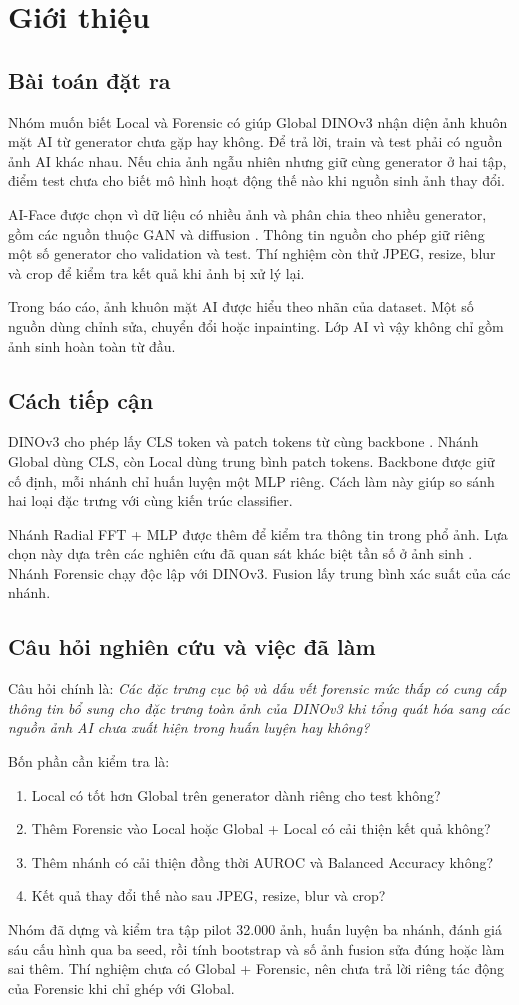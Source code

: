 \section{Giới thiệu}
\subsection{Bài toán đặt ra}
Nhóm muốn biết Local và Forensic có giúp Global DINOv3 nhận diện ảnh khuôn mặt AI từ generator chưa gặp hay không. Để trả lời, train và test phải có nguồn ảnh AI khác nhau. Nếu chia ảnh ngẫu nhiên nhưng giữ cùng generator ở hai tập, điểm test chưa cho biết mô hình hoạt động thế nào khi nguồn sinh ảnh thay đổi.

AI-Face được chọn vì dữ liệu có nhiều ảnh và phân chia theo nhiều generator, gồm các nguồn thuộc GAN và diffusion \cite{Lin_2025_CVPR}. Thông tin nguồn cho phép giữ riêng một số generator cho validation và test. Thí nghiệm còn thử JPEG, resize, blur và crop để kiểm tra kết quả khi ảnh bị xử lý lại.

Trong báo cáo, ảnh khuôn mặt AI được hiểu theo nhãn của dataset. Một số nguồn dùng chỉnh sửa, chuyển đổi hoặc inpainting. Lớp AI vì vậy không chỉ gồm ảnh sinh hoàn toàn từ đầu.

\subsection{Cách tiếp cận}
DINOv3 cho phép lấy CLS token và patch tokens từ cùng backbone \cite{DINOv3_2025}. Nhánh Global dùng CLS, còn Local dùng trung bình patch tokens. Backbone được giữ cố định, mỗi nhánh chỉ huấn luyện một MLP riêng. Cách làm này giúp so sánh hai loại đặc trưng với cùng kiến trúc classifier.

Nhánh Radial FFT + MLP được thêm để kiểm tra thông tin trong phổ ảnh. Lựa chọn này dựa trên các nghiên cứu đã quan sát khác biệt tần số ở ảnh sinh \cite{Frank_2020_ICML,Durall_2020_CVPR}. Nhánh Forensic chạy độc lập với DINOv3. Fusion lấy trung bình xác suất của các nhánh.

\subsection{Câu hỏi nghiên cứu và việc đã làm}
Câu hỏi chính là: \emph{Các đặc trưng cục bộ và dấu vết forensic mức thấp có cung cấp thông tin bổ sung cho đặc trưng toàn ảnh của DINOv3 khi tổng quát hóa sang các nguồn ảnh AI chưa xuất hiện trong huấn luyện hay không?}

Bốn phần cần kiểm tra là:
\begin{enumerate}[nosep]
\item Local có tốt hơn Global trên generator dành riêng cho test không?
\item Thêm Forensic vào Local hoặc Global + Local có cải thiện kết quả không?
\item Thêm nhánh có cải thiện đồng thời AUROC và Balanced Accuracy không?
\item Kết quả thay đổi thế nào sau JPEG, resize, blur và crop?
\end{enumerate}

Nhóm đã dựng và kiểm tra tập pilot 32.000 ảnh, huấn luyện ba nhánh, đánh giá sáu cấu hình qua ba seed, rồi tính bootstrap và số ảnh fusion sửa đúng hoặc làm sai thêm. Thí nghiệm chưa có Global + Forensic, nên chưa trả lời riêng tác động của Forensic khi chỉ ghép với Global.
